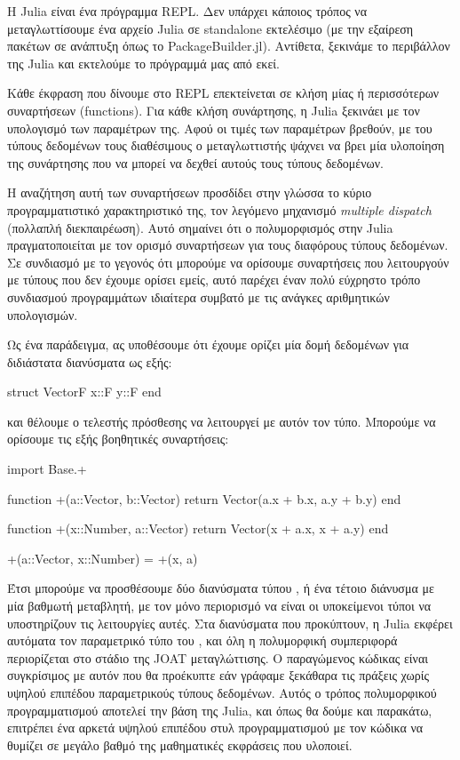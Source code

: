 Η Julia είναι ένα πρόγραμμα REPL.
Δεν υπάρχει κάποιος τρόπος να μεταγλωττίσουμε ένα αρχείο Julia σε standalone εκτελέσιμο (με την εξαίρεση πακέτων σε ανάπτυξη όπως το PackageBuilder.jl).
Αντίθετα, ξεκινάμε το περιβάλλον της Julia και εκτελούμε το πρόγραμμά μας από εκεί.

Κάθε έκφραση που δίνουμε στο REPL επεκτείνεται σε κλήση μίας ή περισσότερων συναρτήσεων (functions).
Για κάθε κλήση συνάρτησης, η Julia ξεκινάει με τον υπολογισμό των παραμέτρων της.
Αφού οι τιμές των παραμέτρων βρεθούν, με του τύπους δεδομένων τους διαθέσιμους ο μεταγλωττιστής ψάχνει να βρει μία υλοποίηση της συνάρτησης που να μπορεί να δεχθεί αυτούς τους τύπους δεδομένων.

Η αναζήτηση αυτή των συναρτήσεων προσδίδει στην γλώσσα το κύριο προγραμματιστικό χαρακτηριστικό της, τον λεγόμενο μηχανισμό \emph{multiple dispatch} (πολλαπλή διεκπαιρέωση).
Αυτό σημαίνει ότι ο πολυμορφισμός στην Julia πραγματοποιείται με τον ορισμό συναρτήσεων για τους διαφόρους τύπους δεδομένων.
Σε συνδιασμό με το γεγονός ότι μπορούμε να ορίσουμε συναρτήσεις που λειτουργούν με τύπους που δεν έχουμε ορίσει εμείς, αυτό παρέχει έναν πολύ εύχρηστο τρόπο συνδιασμού προγραμμάτων ιδιαίτερα συμβατό με τις ανάγκες αριθμητικών υπολογισμών.

Ως ένα παράδειγμα, ας υποθέσουμε ότι έχουμε ορίζει μία δομή δεδομένων για διδιάστατα διανύσματα ως εξής:

\begin{jllisting}[language=julia]
struct Vector{F}
    x::F
    y::F
end
\end{jllisting}

και θέλουμε ο τελεστής πρόσθεσης \jlinl{+} να λειτουργεί με αυτόν τον τύπο.
Μπορούμε να ορίσουμε τις εξής βοηθητικές συναρτήσεις:

\begin{jllisting}[language=julia]
import Base.+

function +(a::Vector, b::Vector)
    return Vector(a.x + b.x, a.y + b.y)
end

function +(x::Number, a::Vector)
    return Vector(x + a.x, x + a.y)
end

+(a::Vector, x::Number) = +(x, a)
\end{jllisting}

Έτσι μπορούμε να προσθέσουμε δύο διανύσματα τύπου , ή ένα τέτοιο διάνυσμα με μία βαθμωτή μεταβλητή, με τον μόνο περιορισμό να είναι οι υποκείμενοι τύποι να υποστηρίζουν τις λειτουργίες αυτές.
Στα διανύσματα που προκύπτουν, η Julia εκφέρει αυτόματα τον παραμετρικό τύπο  του , και όλη η πολυμορφική συμπεριφορά περιορίζεται στο στάδιο της JOAT μεταγλώττισης.
Ο παραγώμενος κώδικας είναι συγκρίσιμος με αυτόν που θα προέκυπτε εάν γράφαμε ξεκάθαρα τις πράξεις χωρίς υψηλού επιπέδου παραμετρικούς τύπους δεδομένων.
Αυτός ο τρόπος πολυμορφικού προγραμματισμού αποτελεί την βάση της Julia, και όπως θα δούμε και παρακάτω, επιτρέπει ένα αρκετά υψηλού επιπέδου στυλ προγραμματισμού με τον κώδικα να θυμίζει σε μεγάλο βαθμό της μαθηματικές εκφράσεις που υλοποιεί.

